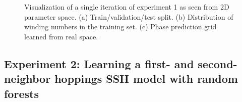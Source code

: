 \documentclass[fleqn,10pt]{wlscirep}
\begin{document}
\begin{figure}
\centering
{}\quad
{}
\caption{Visualization of a single iteration of experiment 1 as seen from 2D parameter space. (a) Train/validation/test split. (b) Distribution of winding numbers in the training set. (c) Phase prediction grid learned from real space.}
\label{figexp1_exp}
\end{figure}

\subsection*{Experiment 2: Learning a first- and second-neighbor hoppings SSH model with random forests}
\label{exp2}
\end{document}
